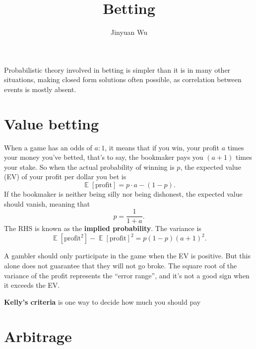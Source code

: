 \documentclass[hyperref, a4paper]{article}
\title{Betting}
\author{Jinyuan Wu}
\DeclareMathOperator{\expect}{\mathbb{E}}
\newcommand*{\concept}[1]{{\textbf{#1}}}
\begin{document}
\maketitle

Probabilistic theory involved in betting is simpler than it is in many other situations,
making closed form solutions often possible,
as correlation between events is mostly absent.

\section{Value betting}

When a game has an odds of $a : 1$,
it means that if you win, your profit $a$ times your money you've betted,
that's to say, the bookmaker pays you $(a + 1)$ times your stake.
So when the actual probability of winning is $p$, 
the expected value (EV) of your profit per dollar you bet is 
\begin{equation}
    \expect[\text{profit}] = p \cdot a - (1 - p).
\end{equation}
If the bookmaker is neither being silly nor being dishonest,
the expected value should vanish, meaning that 
\begin{equation}
    p = \frac{1}{1 + a}.
\end{equation}
The RHS is known as the \concept{implied probability}.
The variance is 
\begin{equation}
     \expect[\text{profit}^2] - \expect[\text{profit}]^2 = p(1-p) (a+1)^2.
\end{equation}

A gambler should only participate in the game when the EV is positive.
But this alone does not guarantee that they will not go broke.
The square root of the variance of the profit represents
the ``error range'', and it's not a good sign when it exceeds the EV.

\concept{Kelly's criteria} is one way to decide how much you should pay 

\section{Arbitrage}
\end{document}
